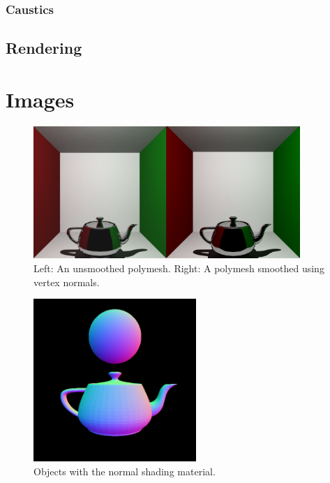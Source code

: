 \documentclass[a4paper]{article}
\begin{document}
\subsubsection{Caustics}

\subsection{Rendering}

\pagebreak
\printbibliography
\pagebreak
\appendix
\section{Images}

\begin{figure}[h]
    \centering
    \includegraphics[width = 0.9\textwidth]{images/pmsmoothing.png}
    \caption{Left: An unsmoothed polymesh. Right: A polymesh smoothed using vertex normals.}\label{fig:smoothing}
\end{figure}

\begin{figure}[h]
    \centering
    \includegraphics[width = 0.55\textwidth]{images/normalshading.png}
    \caption{Objects with the normal shading material.}\label{fig:normalshading}
\end{figure}
\end{document}
